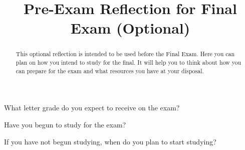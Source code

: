 \documentclass{ximera}
\title{Pre-Exam Reflection for Final Exam (Optional)}
\begin{document}
\begin{abstract}
This optional reflection is intended to be used before the Final Exam. Here you can plan on how you intend to study for the final. It will help you to think about how you can prepare for the exam and what resources you have at your disposal.
\end{abstract}
\maketitle


\begin{question}
    What letter grade do you expect to receive on the exam?

  \begin{multipleChoice}
  \end{multipleChoice}
\end{question}

\begin{question}
    Have you begun to study for the exam?

  \begin{multipleChoice}
  \end{multipleChoice}
\end{question}

\begin{question}
    If you have not begun studying, when do you plan to start studying?

  \begin{multipleChoice}
  \end{multipleChoice}
\end{question}
\end{document}
